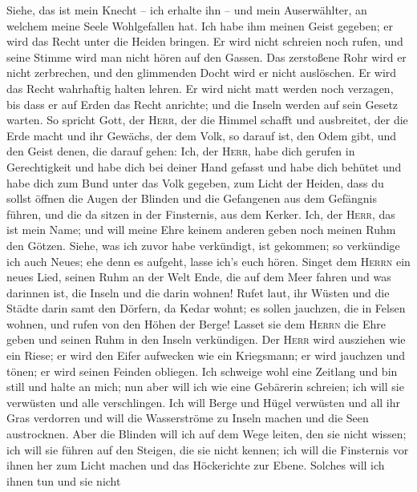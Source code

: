  Siehe, das ist mein Knecht -- ich erhalte ihn -- und mein
Auserwählter, an welchem meine Seele Wohlgefallen hat. Ich habe ihm
meinen Geist gegeben; er wird das Recht unter die Heiden bringen.
 Er wird nicht schreien noch rufen, und seine Stimme wird
man nicht hören auf den Gassen.  Das zerstoßene Rohr wird
er nicht zerbrechen, und den glimmenden Docht wird er nicht auslöschen.
Er wird das Recht wahrhaftig halten lehren.  Er wird nicht
matt werden noch verzagen, bis dass er auf Erden das Recht anrichte; und
die Inseln werden auf sein Gesetz warten.  So spricht
Gott, der \textsc{Herr}, der die Himmel schafft und ausbreitet, der die
Erde macht und ihr Gewächs, der dem Volk, so darauf ist, den Odem gibt,
und den Geist denen, die darauf gehen:  Ich, der
\textsc{Herr}, habe dich gerufen in Gerechtigkeit und habe dich bei
deiner Hand gefasst und habe dich behütet und habe dich zum Bund unter
das Volk gegeben, zum Licht der Heiden,  dass du sollst
öffnen die Augen der Blinden und die Gefangenen aus dem Gefängnis
führen, und die da sitzen in der Finsternis, aus dem Kerker.
 Ich, der \textsc{Herr}, das ist mein Name; und will meine
Ehre keinem anderen geben noch meinen Ruhm den Götzen. 
Siehe, was ich zuvor habe verkündigt, ist gekommen; so verkündige ich
auch Neues; ehe denn es aufgeht, lasse ich's euch hören. 
Singet dem \textsc{Herrn} ein neues Lied, seinen Ruhm an der Welt Ende,
die auf dem Meer fahren und was darinnen ist, die Inseln und die darin
wohnen!  Rufet laut, ihr Wüsten und die Städte darin samt
den Dörfern, da Kedar wohnt; es sollen jauchzen, die in Felsen wohnen,
und rufen von den Höhen der Berge!  Lasset sie dem
\textsc{Herrn} die Ehre geben und seinen Ruhm in den Inseln verkündigen.
 Der \textsc{Herr} wird ausziehen wie ein Riese; er wird
den Eifer aufwecken wie ein Kriegsmann; er wird jauchzen und tönen; er
wird seinen Feinden obliegen.  Ich schweige wohl eine
Zeitlang und bin still und halte an mich; nun aber will ich wie eine
Gebärerin schreien; ich will sie verwüsten und alle verschlingen.
 Ich will Berge und Hügel verwüsten und all ihr Gras
verdorren und will die Wasserströme zu Inseln machen und die Seen
austrocknen.  Aber die Blinden will ich auf dem Wege
leiten, den sie nicht wissen; ich will sie führen auf den Steigen, die
sie nicht kennen; ich will die Finsternis vor ihnen her zum Licht machen
und das Höckerichte zur Ebene. Solches will ich ihnen tun und sie nicht
